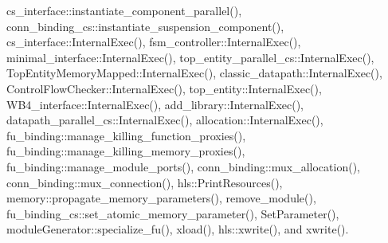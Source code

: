 cs\+\_\+interface\+::instantiate\+\_\+component\+\_\+parallel(), conn\+\_\+binding\+\_\+cs\+::instantiate\+\_\+suspension\+\_\+component(), cs\+\_\+interface\+::\+Internal\+Exec(), fsm\+\_\+controller\+::\+Internal\+Exec(), minimal\+\_\+interface\+::\+Internal\+Exec(), top\+\_\+entity\+\_\+parallel\+\_\+cs\+::\+Internal\+Exec(), Top\+Entity\+Memory\+Mapped\+::\+Internal\+Exec(), classic\+\_\+datapath\+::\+Internal\+Exec(), Control\+Flow\+Checker\+::\+Internal\+Exec(), top\+\_\+entity\+::\+Internal\+Exec(), W\+B4\+\_\+interface\+::\+Internal\+Exec(), add\+\_\+library\+::\+Internal\+Exec(), datapath\+\_\+parallel\+\_\+cs\+::\+Internal\+Exec(), allocation\+::\+Internal\+Exec(), fu\+\_\+binding\+::manage\+\_\+killing\+\_\+function\+\_\+proxies(), fu\+\_\+binding\+::manage\+\_\+killing\+\_\+memory\+\_\+proxies(), fu\+\_\+binding\+::manage\+\_\+module\+\_\+ports(), conn\+\_\+binding\+::mux\+\_\+allocation(), conn\+\_\+binding\+::mux\+\_\+connection(), hls\+::\+Print\+Resources(), memory\+::propagate\+\_\+memory\+\_\+parameters(), remove\+\_\+module(), fu\+\_\+binding\+\_\+cs\+::set\+\_\+atomic\+\_\+memory\+\_\+parameter(), Set\+Parameter(), module\+Generator\+::specialize\+\_\+fu(), xload(), hls\+::xwrite(), and xwrite().

